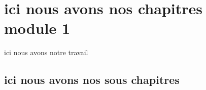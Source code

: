 \chapter{ici nous avons nos chapitres module 1 }
	ici nous avons notre travail

\section{ici nous avons nos sous chapitres}
